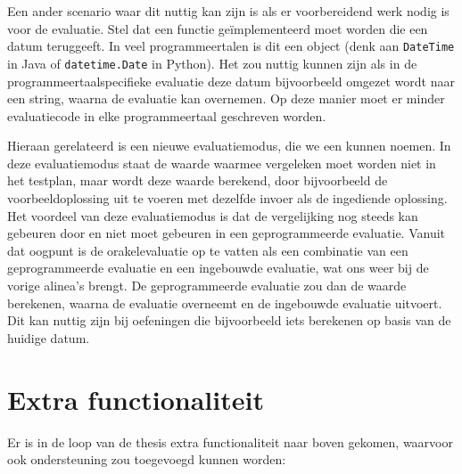 Een ander scenario waar dit nuttig kan zijn is als er voorbereidend werk nodig is voor de evaluatie.
Stel dat een functie geïmplementeerd moet worden die een datum teruggeeft.
In veel programmeertalen is dit een object (denk aan \texttt{DateTime} in Java of \texttt{datetime.Date} in Python).
Het zou nuttig kunnen zijn als in de programmeertaalspecifieke evaluatie deze datum bijvoorbeeld omgezet wordt naar een string, waarna \tested{} de evaluatie kan overnemen.
Op deze manier moet er minder evaluatiecode in elke programmeertaal geschreven worden.

Hieraan gerelateerd is een nieuwe evaluatiemodus, die we een  kunnen noemen.
In deze evaluatiemodus staat de waarde waarmee vergeleken moet worden niet in het testplan, maar wordt deze waarde berekend, door bijvoorbeeld de voorbeeldoplossing uit te voeren met dezelfde invoer als de ingediende oplossing.
Het voordeel van deze evaluatiemodus is dat de vergelijking nog steeds kan gebeuren door \tested{} en niet moet gebeuren in een geprogrammeerde evaluatie.
Vanuit dat oogpunt is de orakelevaluatie op te vatten als een combinatie van een geprogrammeerde evaluatie en een ingebouwde evaluatie, wat ons weer bij de vorige alinea's brengt.
De geprogrammeerde evaluatie zou dan de waarde berekenen, waarna \tested{} de evaluatie overneemt en de ingebouwde evaluatie uitvoert.
Dit kan nuttig zijn bij oefeningen die bijvoorbeeld iets berekenen op basis van de huidige datum.

\section{Extra functionaliteit}\label{sec:kleinere-functies}

Er is in de loop van de thesis extra functionaliteit naar boven gekomen, waarvoor ook ondersteuning zou toegevoegd kunnen worden:

